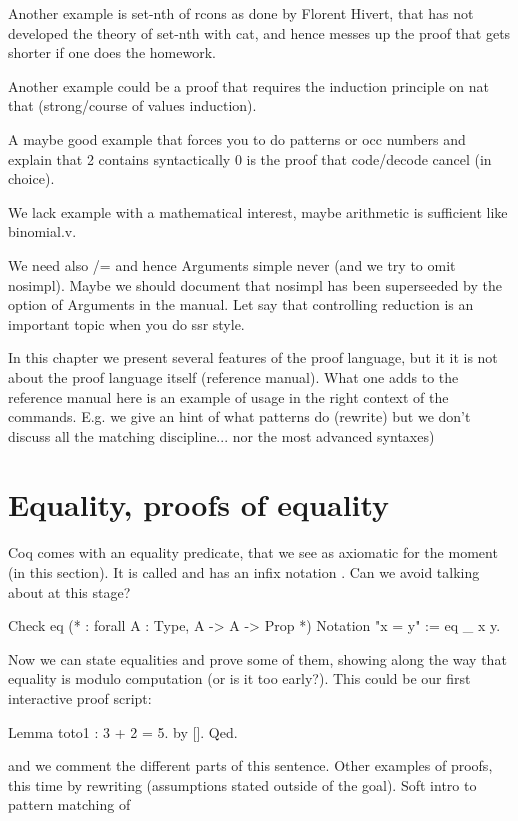 Another example is set-nth of rcons as done by Florent Hivert, that has not
developed the theory of set-nth with cat, and hence messes up the proof
that gets shorter if one does the homework.

Another example could be a proof that requires the induction principle
on nat that (strong/course of values induction).

A maybe good example that forces you to do patterns or occ numbers and explain
that 2  contains syntactically 0 is the proof that code/decode cancel (in
choice).

We lack example with a mathematical interest, maybe arithmetic is sufficient like binomial.v.

We need also /= and hence Arguments simple never (and we try to omit nosimpl).
Maybe we should document that nosimpl has been superseeded by
the option of Arguments in the manual.
Let say that controlling reduction is an important topic when you
do ssr style.

In this chapter we present several features of the proof language, but it it is
not about the proof language itself (reference manual). What one adds to the
reference manual here is an example of usage in the right context of the
commands.  E.g. we give an hint of what patterns do (rewrite) but we don't
discuss all the matching discipline... nor the most advanced syntaxes)

\section{Equality, proofs of equality}

Coq comes with an equality predicate, that we see as axiomatic for the
moment (in this section). It is called  and has an infix
notation \C{=}. Can we avoid talking about  at this stage?

\begin{coq}{}
Check eq  (* : forall A : Type, A -> A -> Prop *)
Notation "x = y" := eq _ x y.
\end{coq}

Now we can state equalities and prove some of them, showing along the way
that equality is modulo computation (or is it too early?). This could
be our first interactive proof script:

\begin{coq}{}
Lemma toto1 : 3 + 2 = 5. by []. Qed.
\end{coq}

and we comment the different parts of this sentence.  Other examples
of proofs, this time by rewriting (assumptions stated
outside of the goal). Soft intro to pattern matching of \C{(_ + _)}

